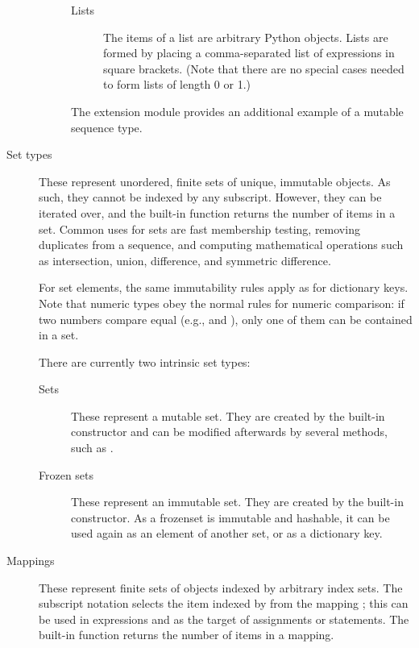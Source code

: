 \begin{description}
\begin{description}
\begin{description}

\item[Lists]
The items of a list are arbitrary Python objects.  Lists are formed
by placing a comma-separated list of expressions in square brackets.
(Note that there are no special cases needed to form lists of length 0
or 1.)

\end{description} %

The extension module  provides an
additional example of a mutable sequence type.


\end{description} %


\item[Set types]
These represent unordered, finite sets of unique, immutable objects.
As such, they cannot be indexed by any subscript. However, they can be
iterated over, and the built-in function  returns the
number of items in a set. Common uses for sets are
fast membership testing, removing duplicates from a sequence, and
computing mathematical operations such as intersection, union, difference,
and symmetric difference.

For set elements, the same immutability rules apply as for dictionary
keys. Note that numeric types obey the normal rules for numeric
comparison: if two numbers compare equal (e.g.,  and
), only one of them can be contained in a set.

There are currently two intrinsic set types:

\begin{description}

\item[Sets]
These represent a mutable set. They are created by the
built-in  constructor and can be modified afterwards
by several methods, such as .

\item[Frozen sets]
These represent an immutable set. They are created by
the built-in  constructor. As a frozenset is
immutable and hashable, it can be used again as an element of another set,
or as a dictionary key.

\end{description} %


\item[Mappings]
These represent finite sets of objects indexed by arbitrary index sets.
The subscript notation  selects the item indexed
by  from the mapping ; this can be used in
expressions and as the target of assignments or  statements.
The built-in function  returns the number of items
in a mapping.


\end{description}
